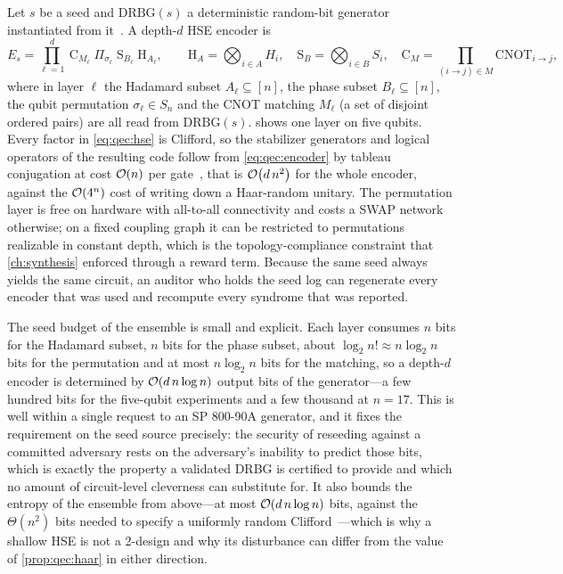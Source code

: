 Let $s$ be a seed and $\mathrm{DRBG}(s)$ a deterministic random-bit generator instantiated from it~\cite{nist2015sp80090a}. A depth-$d$ HSE encoder is
\begin{equation}\label{eq:qec:hse}
  E_s=\prod_{\ell=1}^{d}\ \mathrm{C}_{M_\ell}\;\Pi_{\sigma_\ell}\;\mathrm{S}_{B_\ell}\;\mathrm{H}_{A_\ell},
  \qquad
  \mathrm{H}_{A}=\bigotimes_{i\in A}H_i,\quad
  \mathrm{S}_{B}=\bigotimes_{i\in B}S_i,\quad
  \mathrm{C}_{M}=\prod_{(i\to j)\in M}\mathrm{CNOT}_{i\to j},
\end{equation}
where in layer $\ell$ the Hadamard subset $A_\ell\subseteq[n]$, the phase subset $B_\ell\subseteq[n]$, the qubit permutation $\sigma_\ell\in S_n$ and the CNOT matching $M_\ell$ (a set of disjoint ordered pairs) are all read from $\mathrm{DRBG}(s)$.  shows one layer on five qubits. Every factor in \cref{eq:qec:hse} is Clifford, so the stabilizer generators and logical operators of the resulting code follow from \cref{eq:qec:encoder} by tableau conjugation at cost $\mathcal{O}\!\left(n\right)$ per gate~\cite{aaronson2004stabilizer}, that is $\mathcal{O}\!\left(d\,n^{2}\right)$ for the whole encoder, against the $\mathcal{O}\!\left(4^{n}\right)$ cost of writing down a Haar-random unitary. The permutation layer is free on hardware with all-to-all connectivity and costs a SWAP network otherwise; on a fixed coupling graph it can be restricted to permutations realizable in constant depth, which is the topology-compliance constraint that \cref{ch:synthesis} enforced through a reward term. Because the same seed always yields the same circuit, an auditor who holds the seed log can regenerate every encoder that was used and recompute every syndrome that was reported.

The seed budget of the ensemble is small and explicit. Each layer consumes $n$ bits for the Hadamard subset, $n$ bits for the phase subset, about $\log_2 n!\approx n\log_2 n$ bits for the permutation and at most $n\log_2 n$ bits for the matching, so a depth-$d$ encoder is determined by $\mathcal{O}\!\left(d\,n\log n\right)$ output bits of the generator---a few hundred bits for the five-qubit experiments and a few thousand at $n=17$. This is well within a single request to an SP 800-90A generator, and it fixes the requirement on the seed source precisely: the security of reseeding against a committed adversary rests on the adversary's inability to predict those bits, which is exactly the property a validated DRBG is certified to provide and which no amount of circuit-level cleverness can substitute for. It also bounds the entropy of the ensemble from above---at most $\mathcal{O}\!\left(d\,n\log n\right)$ bits, against the $\Theta(n^{2})$ bits needed to specify a uniformly random Clifford~\cite{koenig2014clifford}---which is why a shallow HSE is not a 2-design and why its disturbance can differ from the value of \cref{prop:qec:haar} in either direction.

